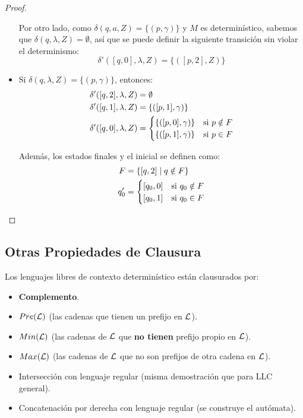 \begin{proof}
\begin{itemize}
        Por otro lado, como $\delta(q, a, Z) = \{(p, \gamma)\}$ y $M$ es determinístico, sabemos que $\delta(q, \lambda, Z) = \emptyset$, así que se puede definir la siguiente transición sin violar el determinismo:
        $$
            \delta'([q, 0], \lambda, Z) = \{([p, 2], Z)\}
        $$

        \item Si $\delta(q, \lambda, Z) = \{(p, \gamma)\}$, entonces:
        $$
        \begin{aligned}
            \delta'([q, 2], \lambda, Z) & = \emptyset \\
            \delta'([q, 1], \lambda, Z) & = \{([p, 1], \gamma)\} \\
            \delta'([q, 0], \lambda, Z) & =
            \begin{cases}
                \{([p, 0], \gamma)\} & \text{si } p \notin F \\
                \{([p, 1], \gamma)\} & \text{si } p \in F
            \end{cases}
        \end{aligned}
        $$

        Además, los estados finales y el inicial se definen como:
        $$
        \begin{aligned}
            F & = \{[q, 2] \mid q \notin F\} \\
            q_0' & =
            \begin{cases}
                [q_0, 0] & \text{si } q_0 \notin F \\
                [q_0, 1] & \text{si } q_0 \in F
            \end{cases}
        \end{aligned}
        $$
    \end{itemize}
\end{proof}

\subsection{Otras Propiedades de Clausura}

Los lenguajes libres de contexto determinístico están clausurados por:

\begin{itemize}
    \item \textbf{Complemento}.
    \item $Pre(\mathcal{L})$ (las cadenas que tienen un prefijo en $\mathcal{L}$).
    \item $Min(\mathcal{L})$ (las cadenas de $\mathcal{L}$ que \textbf{no tienen} prefijo propio en $\mathcal{L}$).
    \item $Max(\mathcal{L})$ (las cadenas de $\mathcal{L}$ que no son prefijos de otra cadena en $\mathcal{L}$).
    \item Intersección con lenguaje regular (misma demostración que para LLC general).
    \item Concatenación por derecha con lenguaje regular (se construye el autómata).
\end{itemize}

